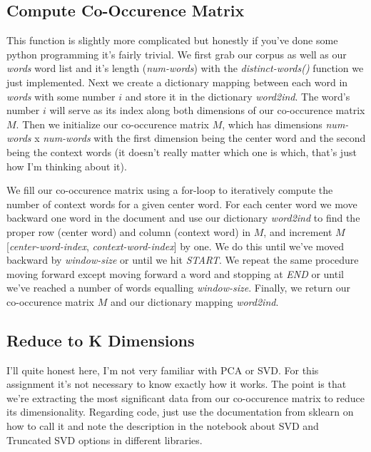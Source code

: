 \documentclass[12pt]{article}
\begin{document}
\subsection{Compute Co-Occurence Matrix}
This function is slightly more complicated but honestly if you've done some python programming it's fairly 
trivial. We first grab our corpus as well as our \emph{words} word list and it's length (\emph{num-words}) 
with the \emph{distinct-words()} function we just implemented. Next we create a dictionary mapping between 
each word in \emph{words} with some number $i$ and store it in the dictionary \emph{word2ind}. The word's 
number $i$ will serve as its index along both dimensions of our co-occurence matrix $M$. Then we 
initialize our co-occurence matrix $M$, which has dimensions \emph{num-words} x \emph{num-words} with the 
first dimension being the center word and the second being the context words (it doesn't really matter which
one is which, that's just how I'm thinking about it).

We fill our co-occurence matrix using a for-loop to iteratively compute the number of context words
for a given center word. For each center word we move backward one word in the document and use our dictionary 
\emph{word2ind} to find the proper row (center word) and column (context word) in $M$, and increment 
$M$[\emph{center-word-index}, \emph{context-word-index}] by one. We do this until we've moved backward 
by \emph{window-size} or until we hit \emph{START}. We repeat the same procedure moving forward
except moving forward a word and stopping at \emph{END} or until we've reached a number of words equalling \emph{window-size}. 
Finally, we return our co-occurence matrix $M$ and our dictionary mapping \emph{word2ind}. 

\subsection{Reduce to K Dimensions}
I'll quite honest here, I'm not very familiar with PCA or SVD. For this assignment it's not necessary 
to know exactly how it works. The point is that we're extracting the most significant data from our 
co-occurence matrix to reduce its dimensionality. Regarding code, just use the documentation from sklearn
on how to call it and note the description in the notebook about SVD and Truncated SVD options in different libraries. 

\subsection{}
\end{document}
